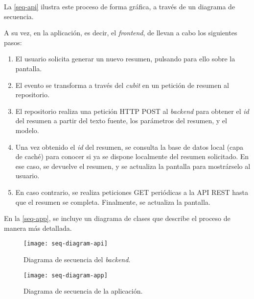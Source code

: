 La \autoref{seq-api} ilustra este proceso de forma gráfica, a través de un diagrama de secuencia.

A su vez, en la aplicación, es decir, el \emph{frontend}, de llevan a cabo los siguientes pasos:

\begin{enumerate}
	\item El usuario solicita generar un nuevo resumen, pulsando para ello sobre la pantalla.
	
	\item El evento se transforma a través del \emph{cubit} en un petición de resumen al repositorio.
	
	\item El repositorio realiza una petición HTTP POST al \emph{backend} para obtener el \emph{id} del resumen a partir del texto fuente, los parámetros del resumen, y el modelo.
	
	\item Una vez obtenido el \emph{id} del resumen, se consulta la base de datos local (capa de caché) para conocer si ya se dispone localmente del resumen solicitado. En ese caso, se devuelve el resumen, y se actualiza la pantalla para mostrárselo al usuario.
	
	\item En caso contrario, se realiza peticiones GET periódicas a la API REST hasta que el resumen se completa. Finalmente, se actualiza la pantalla.
\end{enumerate}

En la \autoref{seq-app}, se incluye un diagrama de clases que describe el proceso de manera más detallada.

\newpage

\begin{figure}[h!]
	\centering
	\hbox{\hspace{-2.3cm}\texttt{[image: seq-diagram-api]}}
	\caption{Diagrama de secuencia del \emph{backend}.}
	\label{seq-api}
\end{figure}


\newpage

\begin{landscape}
	\begin{figure}[h!]
		\centering
		\hbox{\hspace{-2cm}\texttt{[image: seq-diagram-app]}}
		\hspace{-2cm}\caption{Diagrama de secuencia de la aplicación.}
		\label{seq-app}
	\end{figure}
\end{landscape}

